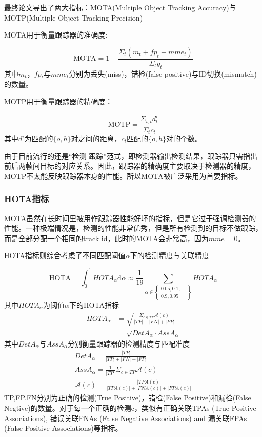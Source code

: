 最终论文导出了两大指标：MOTA(Multiple Object Tracking Accuracy)与MOTP(Multiple Object Tracking Precision)

MOTA用于衡量跟踪器的准确度:

\begin{equation}
    \text{MOTA}=1-\frac{\Sigma_t(m_t+fp_t+mme_t)}{\Sigma_tg_t}
\end{equation}
其中$m_t$，$fp_t$与$mme_t$分别为丢失(miss)，错检(false positive)与ID切换(mismatch)的数量。

MOTP用于衡量跟踪器的精确度：

\begin{equation}
    \text{MOTP}=\frac{\Sigma_{i,t}d_t^i}{\Sigma_tc_t}
\end{equation}
其中$d^i$为匹配的$\{o,h\}$对之间的距离，$c_t$匹配的$\{o,h\}$对的个数。

由于目前流行的还是“检测-跟踪”范式，即检测器输出检测结果，跟踪器只需指出前后两帧间目标的对应关系。因此，跟踪器的精确度主要取决于检测器的精度，MOTP不太能反映跟踪器本身的性能。所以MOTA被广泛采用为首要指标。

\subsubsection{HOTA指标}

MOTA虽然在长时间里被用作跟踪器性能好坏的指标，但是它过于强调检测器的性能。一种极端情况是，检测的性能非常优秀，但是所有检测到的目标不做跟踪，而是全部分配一个相同的track id，此时的MOTA会非常高，因为$mme=0$。

HOTA指标则综合考虑了不同匹配阈值$\alpha$下的检测精度与关联精度

\begin{equation}
    \mathrm{HOTA}=\int_{0}^{1} HOTA_{\alpha} \mathrm{d} \alpha \approx \frac{1}{19} \sum_{\alpha \in\left\{\begin{array}{c}
        0.05,0.1, \ldots \\
        0.9,0.95
        \end{array}\right\}} HOTA_{\alpha}
\end{equation}
其中$HOTA_{\alpha}$为阈值$\alpha$下的HOTA指标
\begin{eqnarray}
    HOTA_{\alpha}
    & =\sqrt{\displaystyle\frac{\Sigma_{c\in{TP}}\mathcal{A}(c)}{|TP|+|FN|+|FP|}}\\
    & =\sqrt{\displaystyle DetA_\alpha\cdot AssA_\alpha}
\end{eqnarray}
其中$DetA_\alpha$与$AssA_\alpha$分别衡量跟踪器的检测精度与匹配准度
\begin{eqnarray}
    DetA_\alpha=\frac{|TP|}{|TP|+|FN|+|FP|}\\
    AssA_\alpha=\frac{1}{|TP|}\Sigma_{c\in{TP}}\mathcal{A}(c)\\
    \mathcal{A}(c)=\frac{|TPA(c)|}{|TPA(c)|+|FNA(c)|+|FPA(c)|}
\end{eqnarray}
TP,FP,FN分别为正确的检测(True Positive)，错检(False Positive)和漏检(False Negtive)的数量。对于每一个正确的检测c，类似有正确关联TPAs (True Positive Associations), 错误关联FNAs (False Negative Associations) and 漏关联FPAs (False Positive Associations)等指标。

